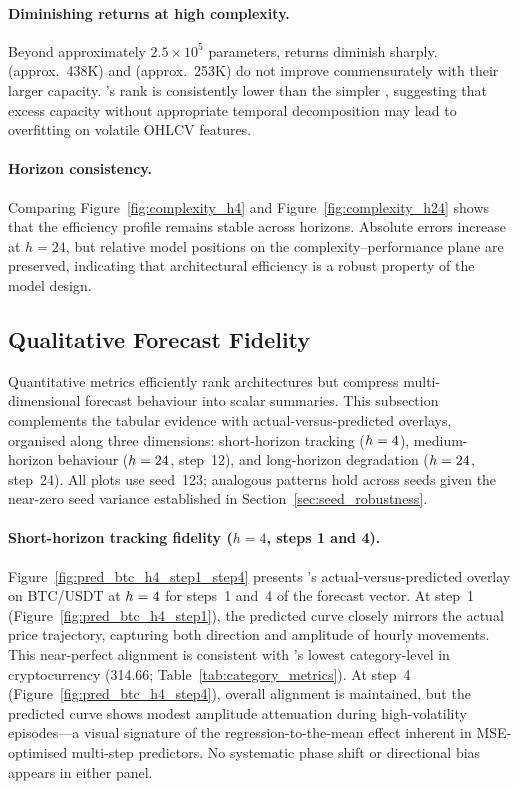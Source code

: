 \paragraph{Diminishing returns at high complexity.}
Beyond approximately $2.5 \times 10^5$ parameters, returns diminish sharply.  \autoformer (approx.\ 438K) and \itransformer (approx.\ 253K) do not improve commensurately with their larger capacity. \autoformer's rank is consistently lower than the simpler \dlinear, suggesting that excess capacity without appropriate temporal decomposition may lead to overfitting on volatile OHLCV features.

\paragraph{Horizon consistency.}
Comparing Figure~\ref{fig:complexity_h4} and Figure~\ref{fig:complexity_h24} shows that the efficiency profile remains stable across horizons.  Absolute errors increase at $h=24$, but relative model positions on the complexity--performance plane are preserved, indicating that architectural efficiency is a robust property of the model design.

\subsection{Qualitative Forecast Fidelity}
\label{sec:qualitative_fidelity}

Quantitative metrics efficiently rank architectures but compress multi-dimensional forecast behaviour into scalar summaries.  This subsection complements the tabular evidence with actual-versus-predicted overlays, organised along three dimensions: short-horizon tracking ($h=4$), medium-horizon behaviour ($h=24$, step~12), and long-horizon degradation ($h=24$, step~24).  All plots use seed~123; analogous patterns hold across seeds given the near-zero seed variance established in Section~\ref{sec:seed_robustness}.

\paragraph{Short-horizon tracking fidelity ($h = 4$, steps 1 and 4).}

Figure~\ref{fig:pred_btc_h4_step1_step4} presents \moderntcn's actual-versus-predicted overlay on BTC/USDT at $h=4$ for steps~1 and~4 of the forecast vector.  At step~1 (Figure~\ref{fig:pred_btc_h4_step1}), the predicted curve closely mirrors the actual price trajectory, capturing both direction and amplitude of hourly movements.  This near-perfect alignment is consistent with \moderntcn's lowest category-level \rmse in cryptocurrency (314.66; Table~\ref{tab:category_metrics}).  At step~4 (Figure~\ref{fig:pred_btc_h4_step4}), overall alignment is maintained, but the predicted curve shows modest amplitude attenuation during high-volatility episodes---a visual signature of the regression-to-the-mean effect inherent in MSE-optimised multi-step predictors.  No systematic phase shift or directional bias appears in either panel.

